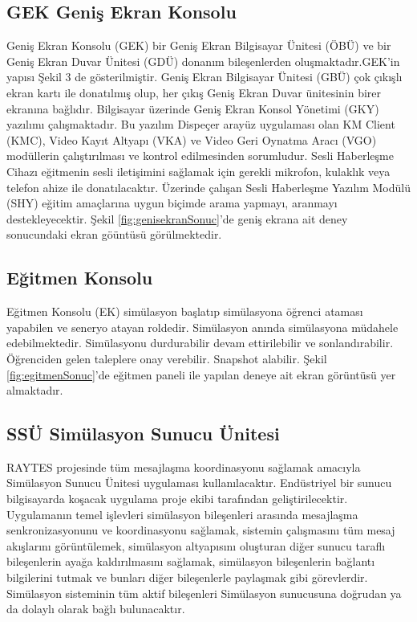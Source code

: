 \documentclass[conference]{IEEEtran}
\begin{document}
\subsection{GEK Geniş Ekran Konsolu}

Geniş Ekran Konsolu (GEK) bir Geniş Ekran Bilgisayar Ünitesi (ÖBÜ) ve bir Geniş Ekran Duvar Ünitesi (GDÜ) donanım bileşenlerden oluşmaktadır.GEK’in yapısı Şekil 3 de gösterilmiştir.
Geniş Ekran Bilgisayar Ünitesi (GBÜ) çok çıkışlı ekran kartı ile donatılmış olup, her çıkış Geniş Ekran Duvar ünitesinin birer ekranına bağlıdır. Bilgisayar üzerinde Geniş Ekran Konsol Yönetimi (GKY) yazılımı çalışmaktadır. Bu yazılım Dispeçer arayüz uygulaması olan KM Client (KMC), Video Kayıt Altyapı (VKA) ve Video Geri Oynatma Aracı (VGO) modüllerin çalıştırılması ve kontrol edilmesinden sorumludur.
Sesli Haberleşme Cihazı eğitmenin sesli iletişimini sağlamak için gerekli mikrofon, kulaklık veya telefon ahize ile donatılacaktır. Üzerinde çalışan Sesli Haberleşme Yazılım Modülü (SHY) eğitim amaçlarına uygun biçimde arama yapmayı, aranmayı destekleyecektir.
Şekil \ref{fig:genisekranSonuc}'de geniş ekrana ait deney sonucundaki ekran göüntüsü görülmektedir.


\subsection{Eğitmen Konsolu}

Eğitmen Konsolu (EK) simülasyon başlatıp simülasyona öğrenci ataması yapabilen ve seneryo atayan roldedir. Simülasyon anında simülasyona müdahele edebilmektedir. Simülasyonu durdurabilir devam ettirilebilir ve sonlandırabilir. Öğrenciden gelen taleplere onay verebilir. Snapshot alabilir. Şekil \ref{fig:egitmenSonuc}'de eğitmen paneli ile yapılan deneye ait ekran görüntüsü yer almaktadır.


\subsection{SSÜ Simülasyon Sunucu Ünitesi}

RAYTES projesinde tüm mesajlaşma koordinasyonu sağlamak amacıyla Simülasyon Sunucu Ünitesi uygulaması kullanılacaktır. Endüstriyel bir sunucu bilgisayarda koşacak uygulama proje ekibi tarafından geliştirilecektir. Uygulamanın temel işlevleri simülasyon bileşenleri arasında mesajlaşma senkronizasyonunu ve koordinasyonu sağlamak, sistemin çalışmasını tüm mesaj akışlarını görüntülemek, simülasyon altyapısını oluşturan diğer sunucu taraflı bileşenlerin ayağa kaldırılmasını sağlamak, simülasyon bileşenlerin bağlantı bilgilerini tutmak ve bunları diğer bileşenlerle paylaşmak gibi görevlerdir. Simülasyon sisteminin tüm aktif bileşenleri Simülasyon sunucusuna doğrudan ya da dolaylı olarak bağlı bulunacaktır.
\end{document}
